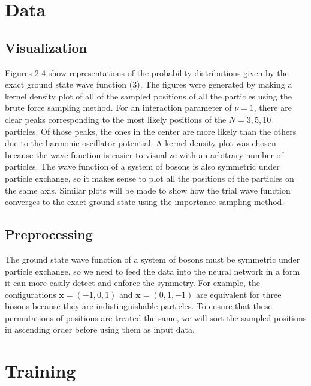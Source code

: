 \documentclass[prb,aps,twocolumn,showpacs,10pt]{revtex4-1}
\begin{document}
\section{Data}

\subsection{Visualization}

Figures 2-4 show representations of the probability distributions given by the exact ground state wave function (3). The figures were generated by making a kernel density plot of all of the sampled positions of all the particles using the brute force sampling method. For an interaction parameter of $\nu = 1$, there are clear peaks corresponding to the most likely positions of the $N=3,5,10$ particles. Of those peaks, the ones in the center are more likely than the others due to the harmonic oscillator potential. A kernel density plot was chosen because the wave function is easier to visualize with an arbitrary number of particles. The wave function of a system of bosons is also symmetric under particle exchange, so it makes sense to plot all the positions of the particles on the same axis. Similar plots will be made to show how the trial wave function converges to the exact ground state using the importance sampling method. 


\subsection{Preprocessing}

The ground state wave function of a system of bosons must be symmetric under particle exchange, so we need to feed the data into the neural network in a form it can more easily detect and enforce the symmetry. For example, the configurations $\bm{x}=(-1,0,1)$ and $\bm{x}=(0,1,-1)$ are equivalent for three bosons because they are indistinguishable particles. To ensure that these permutations of positions are treated the same, we will sort the sampled positions in ascending order before using them as input data. 



\section{Training}
\end{document}
